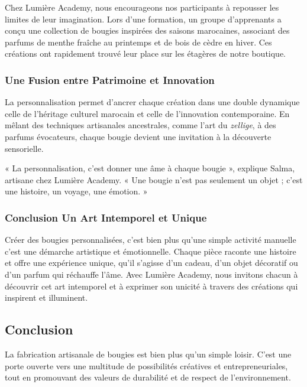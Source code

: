 \documentclass[11pt,fleqn,onecolumn,oneside]{book}
\begin{document}
\begin{example}
Chez Lumière Academy, nous encourageons nos participants à repousser les limites de leur imagination. Lors d’une formation, un groupe d’apprenants a conçu une collection de bougies inspirées des saisons marocaines, associant des parfums de menthe fraîche au printemps et de bois de cèdre en hiver. Ces créations ont rapidement trouvé leur place sur les étagères de notre boutique.
\end{example}

\subsubsection*{Une Fusion entre Patrimoine et Innovation}

La personnalisation permet d’ancrer chaque création dans une double dynamique celle de l’héritage culturel marocain et celle de l’innovation contemporaine. En mêlant des techniques artisanales ancestrales, comme l’art du \textit{zellige}, à des parfums évocateurs, chaque bougie devient une invitation à la découverte sensorielle.

\begin{remark}
« La personnalisation, c’est donner une âme à chaque bougie », explique Salma, artisane chez Lumière Academy. « Une bougie n’est pas seulement un objet ; c’est une histoire, un voyage, une émotion. »
\end{remark}

\subsubsection*{Conclusion Un Art Intemporel et Unique}

Créer des bougies personnalisées, c’est bien plus qu’une simple activité manuelle c’est une démarche artistique et émotionnelle. Chaque pièce raconte une histoire et offre une expérience unique, qu’il s’agisse d’un cadeau, d’un objet décoratif ou d’un parfum qui réchauffe l’âme. Avec Lumière Academy, nous invitons chacun à découvrir cet art intemporel et à exprimer son unicité à travers des créations qui inspirent et illuminent.

\subsection*{Conclusion}

\begin{corollary}
La fabrication artisanale de bougies est bien plus qu’un simple loisir. C’est une porte ouverte vers une multitude de possibilités créatives et entrepreneuriales, tout en promouvant des valeurs de durabilité et de respect de l’environnement.
\end{corollary}
\end{document}
